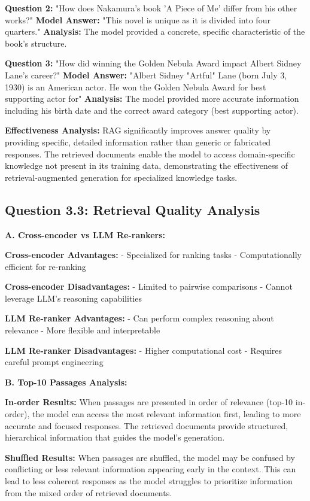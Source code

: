 \documentclass[11pt]{article}
\begin{document}
\textbf{Question 2:} "How does Nakamura's book 'A Piece of Me' differ from his other works?"
\textbf{Model Answer:} "This novel is unique as it is divided into four quarters."
\textbf{Analysis:} The model provided a concrete, specific characteristic of the book's structure.

\textbf{Question 3:} "How did winning the Golden Nebula Award impact Albert Sidney Lane's career?"
\textbf{Model Answer:} "Albert Sidney "Artful" Lane (born July 3, 1930) is an American actor. He won the Golden Nebula Award for best supporting actor for"
\textbf{Analysis:} The model provided more accurate information including his birth date and the correct award category (best supporting actor).

\textbf{Effectiveness Analysis:} RAG significantly improves answer quality by providing specific, detailed information rather than generic or fabricated responses. The retrieved documents enable the model to access domain-specific knowledge not present in its training data, demonstrating the effectiveness of retrieval-augmented generation for specialized knowledge tasks.

\subsection{Question 3.3: Retrieval Quality Analysis}

\textbf{A. Cross-encoder vs LLM Re-rankers:}

\textbf{Cross-encoder Advantages:}
- Specialized for ranking tasks
- Computationally efficient for re-ranking

\textbf{Cross-encoder Disadvantages:}
- Limited to pairwise comparisons
- Cannot leverage LLM's reasoning capabilities

\textbf{LLM Re-ranker Advantages:}
- Can perform complex reasoning about relevance
- More flexible and interpretable

\textbf{LLM Re-ranker Disadvantages:}
- Higher computational cost
- Requires careful prompt engineering

\textbf{B. Top-10 Passages Analysis:}

\textbf{In-order Results:} When passages are presented in order of relevance (top-10 in-order), the model can access the most relevant information first, leading to more accurate and focused responses. The retrieved documents provide structured, hierarchical information that guides the model's generation.

\textbf{Shuffled Results:} When passages are shuffled, the model may be confused by conflicting or less relevant information appearing early in the context. This can lead to less coherent responses as the model struggles to prioritize information from the mixed order of retrieved documents.
\end{document}
